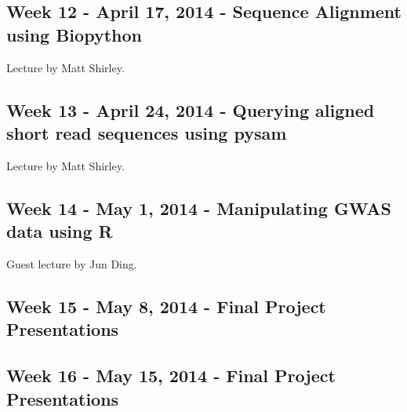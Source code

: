 \documentclass{article}
\begin{document}
\subsection*{Week 12 - April 17, 2014 - Sequence Alignment using Biopython}
Lecture by Matt Shirley.
\subsection*{Week 13 - April 24, 2014 - Querying aligned short read sequences using pysam}
Lecture by Matt Shirley.
\subsection*{Week 14 - May 1, 2014 - Manipulating GWAS data using R}
Guest lecture by Jun Ding.
\subsection*{Week 15 - May 8, 2014 - Final Project Presentations}
\subsection*{Week 16 - May 15, 2014 - Final Project Presentations}
\end{document}
